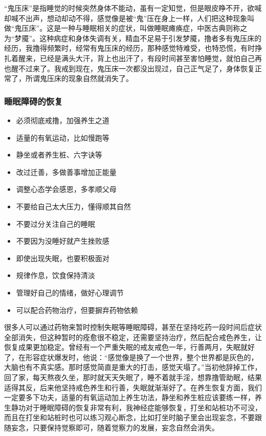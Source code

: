 “鬼压床”是指睡觉的时候突然身体不能动，虽有一定知觉，但是眼皮睁不开，欲喊却喊不出声，想动却动不得，感觉像是被“鬼”压在身上一样，人们把这种现象叫做“鬼压床”。这是一种与睡眠相关的症状，叫做睡眠瘫痪症，中医古典则称之为“梦魇”。这种病症和身体失调有关，精血不足易于引发梦魇，撸者多有鬼压床的经历，我撸得频繁时，经常有鬼压床的经历，那种感觉特难受，也特恐慌，有时挣扎着醒来，已经是满头大汗，背上也出汗了，有段时间甚至害怕睡觉，就怕自己再也醒不过来了。我戒到现在，鬼压床一次都没出现过，自己正气足了，身体恢复正常了，所谓鬼压床的现象自然就消失了。

\subsubsection{睡眠障碍的恢复}

\begin{itemize}
    \item 必须彻底戒撸，加强养生之道
    \item 适量的有氧运动，比如慢跑等
    \item 静坐或者养生桩、六字诀等
    \item 改过迁善，多做善事增加正能量
    \item 调整心态学会感恩，多孝顺父母
    \item 不要给自己太大压力，懂得顺其自然
    \item 不要过分关注自己的睡眠
    \item 不要因为没睡好就产生挫败感
    \item 即使出现失眠，也要积极面对
    \item 规律作息，饮食保持清淡
    \item 管理好自己的情绪，做好心理调节
    \item 可以配合药物治疗，但要摒弃药物依赖
\end{itemize}

很多人可以通过药物来暂时控制失眠等睡眠障碍，甚至在坚持吃药一段时间后症状全部消失，但这种暂时的痊愈很不稳定，还需要坚持治疗，然后配合戒色养生，让恢复成果更加稳定。曾经有一个严重失眠的戒友戒色一年，行善两月，失眠就好了，在形容症状爆发时，他说：“感觉像是换了一个世界，整个世界都是灰色的，大脑也有不真实感。那时感觉简直是重大的打击，感觉天塌了。”当初他辞掉工作，回了家，每天熬夜久坐，那时就天天失眠了，睡不着就手淫，想靠撸管助眠，结果适得其反，后来他坚持戒色养生和行善，失眠就渐渐好了。在养生恢复方面，我们一定要多下功夫，适量的有氧运动加上养生功法，静坐和养生桩应该要练一样，养生静功对于睡眠障碍的恢复非常有利，我神经症能够恢复，打坐和站桩功不可没，而且在打坐和站桩时也可以练习观心断念，比如打坐时脑子里会出现妄念，不要跟随妄念，只要保持觉察即可，随着觉察力的发展，妄念自然会消失。

